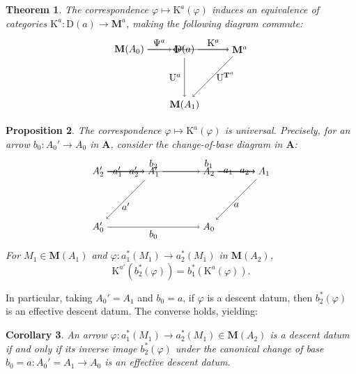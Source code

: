 \documentclass{article}
\theoremstyle{plain}
\newtheorem{theorem}{Theorem}[section]
\newtheorem{proposition}[theorem]{Proposition}
\newtheorem{corollary}[theorem]{Corollary}
\theoremstyle{remark}
\begin{document}
\begin{theorem}
\label{thm:equivalence}
The correspondence $\varphi \mapsto \mathrm{K}^a(\varphi)$ induces an equivalence of categories $\mathrm{K}^a : \mathrm{D}(a) \to \mathbf{M}^a$, making the following diagram commute:
\[
\begin{tikzpicture}
    \node (M0) at (0,2) {$\mathbf{M}(A_0)$};
    \node (Da) at (2,2) {$\mathrm{D}(a)$};
    \node (Ma) at (4,2) {$\mathbf{M}^a$};
    \node (M1) at (2,0) {$\mathbf{M}(A_1)$};
    \draw[->] (M0) to node[above] {$\Psi^a$} (Da);
    \draw[->] (Da) to node[above] {$\mathrm{K}^a$} (Ma);
    \draw[->] (M0) to node[left] {$\Phi^a$} (Ma);
    \draw[->] (Da) to node[left] {$\mathrm{U}^a$} (M1);
    \draw[->] (Ma) to node[right] {$\mathrm{U}^{\mathbf{T}^a}$} (M1);
\end{tikzpicture}
\]
\end{theorem}

\begin{proposition}
\label{prop:universal}
The correspondence $\varphi \mapsto \mathrm{K}^a(\varphi)$ is universal. Precisely, for an arrow $b_0 : A_0' \to A_0$ in $\mathbf{A}$, consider the change-of-base diagram in $\mathbf{A}$:
\[
\begin{tikzpicture}
    \node (A2') at (0,2) {$A_2'$};
    \node (A1') at (2,2) {$A_1'$};
    \node (A0') at (0,0) {$A_0'$};
    \node (A2) at (4,2) {$A_2$};
    \node (A1) at (6,2) {$A_1$};
    \node (A0) at (4,0) {$A_0$};
    \draw[->] (A2') to node[above] {$b_2$} (A2);
    \draw[->] (A1') to node[above] {$b_1$} (A1);
    \draw[->] (A0') to node[below] {$b_0$} (A0);
    \draw[->] (A2') to node[left] {$a_1'$} (A1');
    \draw[->] (A2) to node[left] {$a_1$} (A1);
    \draw[->] (A2') to node[right] {$a_2'$} (A1');
    \draw[->] (A2) to node[right] {$a_2$} (A1);
    \draw[->] (A1') to node[below] {$a'$} (A0');
    \draw[->] (A1) to node[below] {$a$} (A0);
\end{tikzpicture}
\]
For $M_1 \in \mathbf{M}(A_1)$ and $\varphi : a_1^*(M_1) \to a_2^*(M_1)$ in $\mathbf{M}(A_2)$,
\[
\mathrm{K}^{a'}(b_2^*(\varphi)) = b_1^*(\mathrm{K}^a(\varphi)).
\]
\end{proposition}

In particular, taking $A_0' = A_1$ and $b_0 = a$, if $\varphi$ is a descent datum, then $b_2^*(\varphi)$ is an effective descent datum. The converse holds, yielding:

\begin{corollary}
\label{cor:effective-descent}
An arrow $\varphi : a_1^*(M_1) \to a_2^*(M_1) \in \mathbf{M}(A_2)$ is a descent datum if and only if its inverse image $b_2^*(\varphi)$ under the canonical change of base $b_0 = a : A_0' = A_1 \to A_0$ is an effective descent datum.
\end{corollary}
\end{document}
